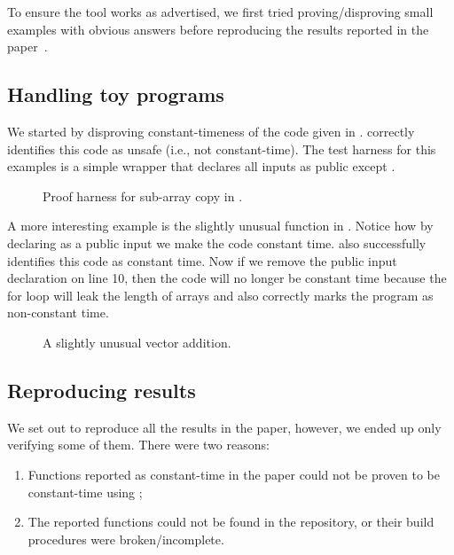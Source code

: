 To ensure the tool works as advertised, we first tried proving/disproving
small examples with obvious answers before reproducing the
results reported in the paper~\cite{almeida}.


\subsection{Handling toy programs}

We started by disproving constant-timeness of the code given in .
\ctVerif correctly identifies this code as unsafe (i.e., not constant-time).
The test harness for this examples is a simple wrapper that declares all inputs
as public except .

\begin{figure}[h]
    \centering\resizebox{0.7\columnwidth}{!}{}
    \caption{Proof harness for sub-array copy in .}
    \label{fig:example_wrapper}
\end{figure}

A more interesting example is the slightly unusual 
function in . Notice how by declaring  as
a public input we make the code constant time. \ctVerif also successfully
identifies this code as constant time. Now if we remove the public input
declaration on line 10, then the code will no longer be constant time because the
for loop will leak the length of arrays and \ctVerif also correctly marks the
program as non-constant time.

\begin{figure}[h]
    \centering\resizebox{0.7\columnwidth}{!}{}
    \caption{A slightly unusual vector addition.}
    \label{fig:vector_add}
\end{figure}


\subsection{Reproducing results}


We set out to reproduce all the results in the paper, however, we ended up
only verifying some of them. There were two reasons:
\begin{enumerate}
    \item Functions reported as constant-time in the paper could not be proven
    to be constant-time using \ctVerif;
    \item The reported functions could not be found in the \ctVerif repository,
    or their build procedures were broken/incomplete.
\end{enumerate}

